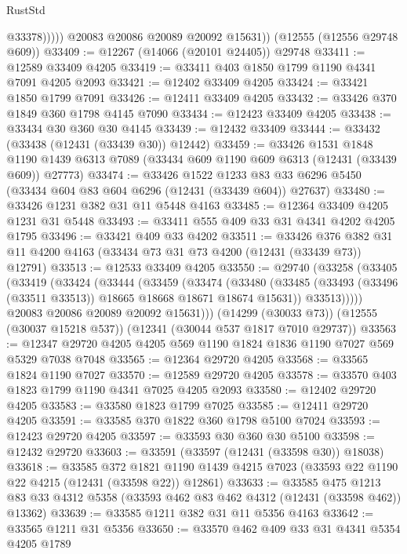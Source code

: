 \begin{lexlean}{RustStd}
\begin{coremodule}
                  @33378)))))
        @20083
        @20086
        @20089
        @20092
        @15631))
    (@12555 (@12556 @29748 @609))
@33409 := @12267 (@14066 (@20101 @24405)) @29748
@33411 := @12589 @33409 @4205
@33419 := @33411 @403 @1850 @1799 @1190 @4341 @7091 @4205 @2093
@33421 := @12402 @33409 @4205
@33424 := @33421 @1850 @1799 @7091
@33426 := @12411 @33409 @4205
@33432 := @33426 @370 @1849 @360 @1798 @4145 @7090
@33434 := @12423 @33409 @4205
@33438 := @33434 @30 @360 @30 @4145
@33439 := @12432 @33409
@33444 := @33432 (@33438 (@12431 (@33439 @30)) @12442)
@33459 := @33426
    @1531
    @1848
    @1190
    @1439
    @6313
    @7089
    (@33434 @609 @1190 @609 @6313 (@12431 (@33439 @609)) @27773)
@33474 := @33426
    @1522
    @1233
    @83
    @33
    @6296
    @5450
    (@33434 @604 @83 @604 @6296 (@12431 (@33439 @604)) @27637)
@33480 := @33426 @1231 @382 @31 @11 @5448 @4163
@33485 := @12364 @33409 @4205 @1231 @31 @5448
@33493 := @33411 @555 @409 @33 @31 @4341 @4202 @4205 @1795
@33496 := @33421 @409 @33 @4202
@33511 := @33426
    @376
    @382
    @31
    @11
    @4200
    @4163
    (@33434 @73 @31 @73 @4200 (@12431 (@33439 @73)) @12791)
@33513 := @12533 @33409 @4205
@33550 := @29740
    (@33258
      (@33405
        (@33419
          (@33424
            (@33444
              (@33459
                (@33474
                  (@33480
                    (@33485 (@33493 (@33496 (@33511 @33513)) @18665 @18668 @18671 @18674 @15631))
                    @33513)))))
          @20083
          @20086
          @20089
          @20092
          @15631)))
    (@14299 (@30033 @73))
    (@12555 (@30037 @15218 @537))
    (@12341 (@30044 @537 @1817 @7010 @29737))
@33563 := @12347 @29720 @4205 @4205 @569 @1190 @1824 @1836 @1190 @7027 @569 @5329 @7038 @7048
@33565 := @12364 @29720 @4205
@33568 := @33565 @1824 @1190 @7027
@33570 := @12589 @29720 @4205
@33578 := @33570 @403 @1823 @1799 @1190 @4341 @7025 @4205 @2093
@33580 := @12402 @29720 @4205
@33583 := @33580 @1823 @1799 @7025
@33585 := @12411 @29720 @4205
@33591 := @33585 @370 @1822 @360 @1798 @5100 @7024
@33593 := @12423 @29720 @4205
@33597 := @33593 @30 @360 @30 @5100
@33598 := @12432 @29720
@33603 := @33591 (@33597 (@12431 (@33598 @30)) @18038)
@33618 := @33585
    @372
    @1821
    @1190
    @1439
    @4215
    @7023
    (@33593 @22 @1190 @22 @4215 (@12431 (@33598 @22)) @12861)
@33633 := @33585
    @475
    @1213
    @83
    @33
    @4312
    @5358
    (@33593 @462 @83 @462 @4312 (@12431 (@33598 @462)) @13362)
@33639 := @33585 @1211 @382 @31 @11 @5356 @4163
@33642 := @33565 @1211 @31 @5356
@33650 := @33570 @462 @409 @33 @31 @4341 @5354 @4205 @1789

\end{coremodule}
\end{lexlean}
